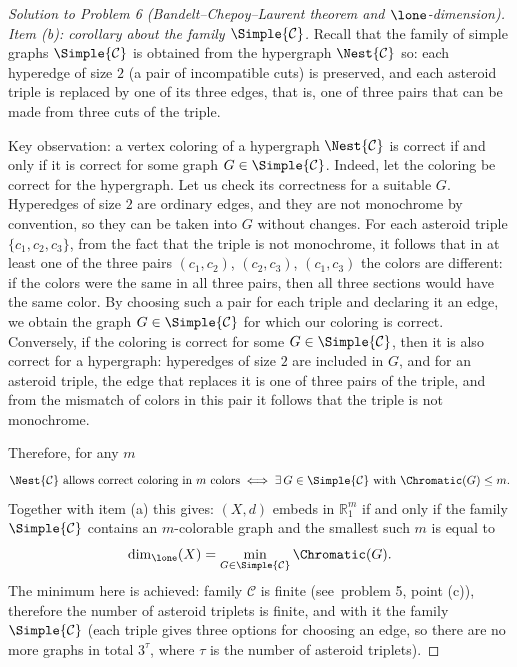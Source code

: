 \documentclass[a4paper,12pt]{report}
\begin{document}
\begin{proof}[Solution to Problem \textup{6} \textup{(}Bandelt--Chepoy--Laurent theorem and $\lone$-dimension\textup{)}]
\textit{Item \textup{(b)}\textup{:} corollary about the family $\Simple{\mathcal C}$.} Recall that the family of simple graphs $\Simple{\mathcal C}$ is obtained from the hypergraph $\Nest{\mathcal C}$ so\textup{:} each hyperedge of size $2$ \textup{(}a pair of incompatible cuts\textup{)} is preserved, and each asteroid triple is replaced by one of its three edges, that is, one of three pairs that can be made from three cuts of the triple.

Key observation\textup{:} a vertex coloring of a hypergraph $\Nest{\mathcal C}$ is correct if and only if it is correct for some graph $G\in\Simple{\mathcal C}$. Indeed, let the coloring be correct for the hypergraph. Let us check its correctness for a suitable $G$. Hyperedges of size $2$ are ordinary edges, and they are not monochrome by convention, so they can be taken into $G$ without changes. For each asteroid triple $\{c_1,c_2,c_3\}$, from the fact that the triple is not monochrome, it follows that in at least one of the three pairs $(c_1,c_2)$, $(c_2,c_3)$, $(c_1,c_3)$ the colors are different\textup{:} if the colors were the same in all three pairs, then all three sections would have the same color. By choosing such a pair for each triple and declaring it an edge, we obtain the graph $G\in\Simple{\mathcal C}$ for which our coloring is correct. Conversely, if the coloring is correct for some $G\in\Simple{\mathcal C}$, then it is also correct for a hypergraph\textup{:} hyperedges of size $2$ are included in $G$, and for an asteroid triple, the edge that replaces it is one of three pairs of the triple, and from the mismatch of colors in this pair it follows that the triple is not monochrome.

Therefore, for any $m$
\[
\Nest{\mathcal C}\ \text{allows correct coloring in } m\ \text{colors}
\iff
\exists\,G\in\Simple{\mathcal C}\text{ with }\Chromatic(G)\le m.
\]
Together with item \textup{(a)} this gives\textup{:} $(X,d)$ embeds in $\mathbb R^m_1$ if and only if the family $\Simple{\mathcal C}$ contains an $m$-colorable graph and the smallest such $m$ is equal to
\[
\dim_{\lone}(X)=\min_{G\in\Simple{\mathcal C}}\Chromatic(G).
\]
The minimum here is achieved\textup{:} family $\mathcal C$ is finite \textup{(}see\ problem \textup{5}, point \textup{(c)}\textup{)}, therefore the number of asteroid triplets is finite, and with it the family $\Simple{\mathcal C}$ \textup{(}each triple gives three options for choosing an edge, so there are no more graphs in total $3^{\tau}$, where $\tau$ is the number of asteroid triplets\textup{)}.
\end{proof}
\end{document}
